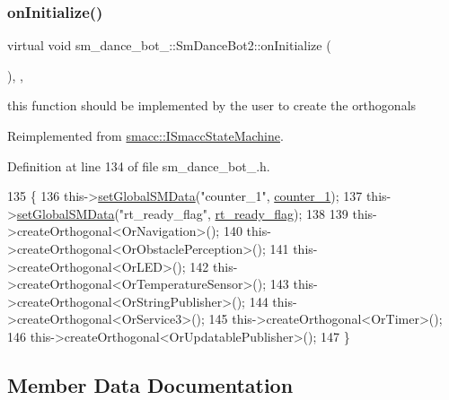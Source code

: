 \subsubsection{\texorpdfstring{on\+Initialize()}{onInitialize()}}
{\footnotesize\ttfamily virtual void sm\+\_\+dance\+\_\+bot\+\_\+::\+Sm\+Dance\+Bot2\+::on\+Initialize (\begin{DoxyParamCaption}{ }\end{DoxyParamCaption})\hspace{0.3cm}{\ttfamily [inline]}, {\ttfamily [override]}, {\ttfamily [virtual]}}



this function should be implemented by the user to create the orthogonals 



Reimplemented from \hyperlink{classsmacc_1_1ISmaccStateMachine_ac2982c6c8283663e5e1e8a7c82f511ec}{smacc\+::\+I\+Smacc\+State\+Machine}.



Definition at line 134 of file sm\+\_\+dance\+\_\+bot\+\_.\+h.


\begin{DoxyCode}
135     \{
136         this->\hyperlink{classsmacc_1_1ISmaccStateMachine_a8588f9e580fbb95b53e2bd2ca3ff1f98}{setGlobalSMData}(\textcolor{stringliteral}{"counter\_1"}, \hyperlink{structsm__dance__bot__2_1_1SmDanceBot2_a37bab7336653c009ad8a3e31c596b132}{counter\_1});
137         this->\hyperlink{classsmacc_1_1ISmaccStateMachine_a8588f9e580fbb95b53e2bd2ca3ff1f98}{setGlobalSMData}(\textcolor{stringliteral}{"rt\_ready\_flag"}, \hyperlink{structsm__dance__bot__2_1_1SmDanceBot2_a864092503acb358517e58bb8db064cbe}{rt\_ready\_flag});
138 
139         this->createOrthogonal<OrNavigation>();
140         this->createOrthogonal<OrObstaclePerception>();
141         this->createOrthogonal<OrLED>();
142         this->createOrthogonal<OrTemperatureSensor>();
143         this->createOrthogonal<OrStringPublisher>();
144         this->createOrthogonal<OrService3>();
145         this->createOrthogonal<OrTimer>();
146         this->createOrthogonal<OrUpdatablePublisher>();
147     \}
\end{DoxyCode}


\subsection{Member Data Documentation}
\mbox{\label{structsm__dance__bot__2_1_1SmDanceBot2_a37bab7336653c009ad8a3e31c596b132}} 

